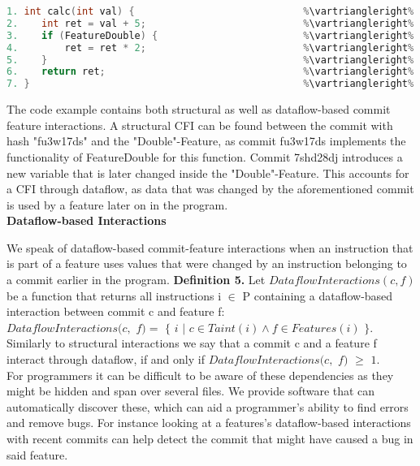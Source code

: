 \begin{lstlisting}[language=C++, caption={Commit Feature Interactions}, label=DescriptiveLabel]	
1. int calc(int val) {                             %\vartriangleright% %d93dj4gr%
2.    int ret = val + 5;                           %\vartriangleright% %7shd28dj%
3.    if (FeatureDouble) {                         %\vartriangleright% %fu3w17ds%    %\vartriangleright% %FeatureDouble%
4.        ret = ret * 2;                           %\vartriangleright% %fu3w17ds%    %\vartriangleright% %FeatureDouble%
5.    }                                            %\vartriangleright% %fu3w17ds%    %\vartriangleright% %FeatureDouble%
6.    return ret;                                  %\vartriangleright% %d93dj4gr%   
7. }                                               %\vartriangleright% %d93dj4gr%   
\end{lstlisting}
The code example contains both structural as well as dataflow-based commit feature interactions.
A structural CFI can be found between the commit with hash "fu3w17ds" and the "Double"-Feature, as commit fu3w17ds implements the functionality of FeatureDouble for this function. 
Commit 7shd28dj introduces a new variable that is later changed inside the "Double"-Feature. 
This accounts for a CFI through dataflow, as data that was changed by the aforementioned commit is used by a feature later on in the program. \\

\textbf{Dataflow-based Interactions} 

We speak of dataflow-based commit-feature interactions when an instruction that is part of a feature uses values that were changed by an instruction belonging to a commit earlier in the program.
\textbf{Definition 5.} Let $DataflowInteractions(c, f)$ be a function that returns all instructions i $\in$ P containing a dataflow-based interaction between commit c and feature f: \\
$DataflowInteractions(c,$ $f) = $ $\{$ $i$ $|$ $ c \in Taint(i) \land f \in Features(i)$ $\}$. \\
Similarly to structural interactions we say that a commit c and a feature f interact through dataflow, if and only if $DataflowInteractions(c,$ $f)$ $\geq$ $1$. \\
For programmers it can be difficult to be aware of these dependencies as they might be hidden and span over several files.
We provide software that can automatically discover these, which can aid a programmer's ability to find errors and remove bugs.
For instance looking at a features's dataflow-based interactions with recent commits can help detect the commit that might have caused a bug in said feature.
